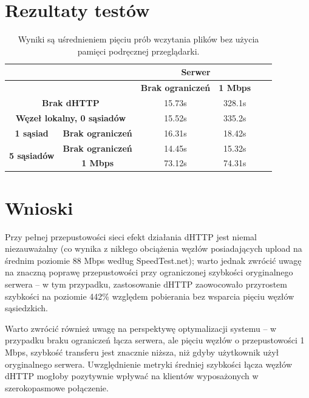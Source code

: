 \section{Rezultaty testów}
\begin{table}[H]
\centering
    \begin{tabular}{|c|c|c|c|c|c|}
        \hline
         & & \multicolumn{2}{c|}{\textbf{Serwer}} \\ \hline
         & & \textbf{Brak ograniczeń} & \textbf{1 Mbps} \\ \hline
         \multicolumn{2}{|c|}{\textbf{Brak dHTTP}} & 15.73s & 328.1s \\ \hline
         \multicolumn{2}{|c|}{\textbf{Węzeł lokalny, 0 sąsiadów}} & 15.52s & 335.2s \\ \hline \hline
         \textbf{1 sąsiad} & \textbf{Brak ograniczeń} & 16.31s & 18.42s \\ \hline
         \multirow{2}{*}{\textbf{5 sąsiadów}} & \textbf{Brak ograniczeń} & 14.45s & 15.32s \\ 
          & \textbf{1 Mbps} & 73.12s & 74.31s \\  \hline
    \end{tabular}
    \label{tab:test-results}
    \caption{Wyniki są uśrednieniem pięciu prób wczytania plików bez użycia pamięci podręcznej przeglądarki.}
\end{table}

\section{Wnioski}

Przy pełnej przepustowości sieci efekt działania dHTTP jest niemal niezauważalny (co wynika z nikłego obciążenia węzłów posiadających upload na średnim poziomie 88 Mbps według SpeedTest.net); warto jednak zwrócić uwagę na znaczną poprawę przepustowości przy ograniczonej szybkości oryginalnego serwera -- w tym przypadku, zastosowanie dHTTP zaowocowało przyrostem szybkości na poziomie 442\% względem pobierania bez wsparcia pięciu węzłów sąsiedzkich.

Warto zwrócić również uwagę na perspektywę optymalizacji systemu -- w przypadku braku ograniczeń łącza serwera, ale pięciu węzłów o przepustowości 1 Mbps, szybkość transferu jest znacznie niższa, niż gdyby użytkownik użył oryginalnego serwera. Uwzględnienie metryki średniej szybkości łącza węzłów dHTTP mogłoby pozytywnie wpływać na klientów wyposażonych w szerokopasmowe połączenie. 